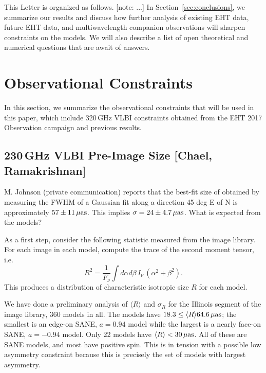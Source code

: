\documentclass[twocolumn,tighten,dvipsnames]{aastex63}
\newcommand\note[1]{{\color{OliveGreen}[note: #1]}}
\begin{document}

This Letter is organized as follows.
\note{...}
In Section~\ref{sec:conclusions}, we summarize our results and discuss
how further analysis of existing EHT data, future EHT data, and
multiwavelength companion observations will sharpen constraints on the
models.
We will also describe a list of open theoretical and numerical
questions that are await of answers.

\section{Observational Constraints}
\label{sec:constraints}

In this section, we summarize the observational constraints that will
be used in this paper, which include 320\,GHz VLBI constraints
obtained from the EHT 2017 Observation campaign and previous results.

\subsection{230\,GHz VLBI Pre-Image Size
  [Chael, Ramakrishnan]}
\label{sec:230size}

M. Johnson (private communication) reports that the best-fit size of \sgra obtained by measuring the FWHM of a Gaussian fit along a direction 45 deg E of N is approximately $57 \pm 11 {\rm \, \mu as}$.  This implies $\sigma = 24 \pm 4.7 {\rm \, \mu as}$.  What is expected from the models?

As a first step, consider the following statistic measured from the image library.  For each image in each model, compute the trace of the second moment tensor, i.e.
\begin{equation}
  R^2 = \frac{1}{F_\nu} \int d\alpha d\beta \, I_\nu \, (\alpha^2 + \beta^2).
\end{equation}
This produces a distribution of characteristic isotropic size $R$ for each model.

We have done a preliminary analysis of $\langle R \rangle$ and $\sigma_R$ for the Illinois segment of the image library, 360 models in all.  The models have  $18.3 \le \langle R \rangle 64.6 {\rm \, \mu as}$; the smallest is an edge-on SANE, $a = 0.94$ model while the largest is a nearly face-on SANE, $a = -0.94$ model.  Only 22 models have $\langle R \rangle < 30{\rm \, \mu as}$.  All of these are SANE models, and most have positive spin.  This is in tension with a possible low  asymmetry constraint because this is precisely the set of models with largest asymmetry.
\end{document}
